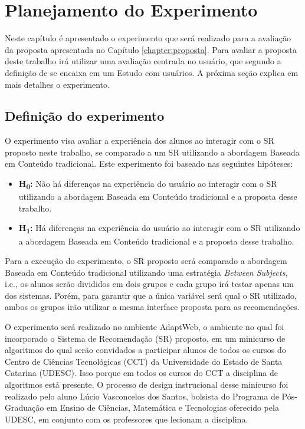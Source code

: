 \chapter{Planejamento do Experimento}\label{chapter:experimento}

Neste capítulo é apresentado o experimento que será realizado para a avaliação da proposta apresentada no Capítulo \ref{chapter:proposta}.
Para avaliar a proposta deste trabalho irá utilizar uma avaliação centrada no usuário, que segundo a definição de
 se encaixa em um Estudo com usuários. A próxima seção explica em mais detalhes o experimento.

\section{Definição do experimento}

O experimento visa avaliar a experiência dos alunos ao interagir com o SR proposto neste trabalho, se comparado a um SR
utilizando a abordagem Baseada em Conteúdo tradicional. Este experimento foi
baseado nas seguintes hipóteses:

\begin{itemize}
\item \textbf{H\textsubscript{0}:} Não há diferenças na experiência do usuário ao interagir com o SR utilizando a abordagem
Baseada em Conteúdo tradicional e a proposta desse trabalho.
\item \textbf{H\textsubscript{1}:} Há diferenças na experiência do usuário ao interagir com o SR utilizando a abordagem
Baseada em Conteúdo tradicional e a proposta desse trabalho.
\end{itemize}

Para a execução do experimento, o SR proposto será comparado a abordagem Baseada em Conteúdo tradicional utilizando uma
estratégia \textit{Between Subjects}, i.e., os alunos serão divididos em dois grupos e cada grupo irá testar apenas
um dos sistemas. Porém, para garantir que a única variável será qual o SR utilizado, ambos os grupos irão utilizar a mesma
interface proposta para as recomendações.

O experimento será realizado no ambiente AdaptWeb\textsuperscript{\textregistered}, o ambiente no qual foi incorporado o
Sistema de Recomendação (SR) proposto, em um minicurso de algoritmos do qual serão convidados a participar alunos de todos os cursos do Centro de
Ciências Tecnológicas (CCT) da Universidade do Estado de Santa Catarina (UDESC). Isso porque em todos os cursos do CCT
a disciplina de algoritmos está presente. O processo de design instrucional desse minicurso foi realizado pelo aluno
Lúcio Vasconcelos dos Santos, bolsista do Programa de Pós-Graduação em Ensino de Ciências, Matemática e Tecnologias
oferecido pela UDESC, em conjunto com os professores que lecionam a disciplina.

